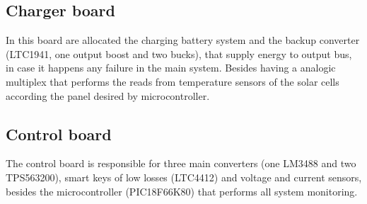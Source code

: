 \documentclass[3p]{elsarticle}
\begin{document}
\subsection{Charger board}
\label{Charger board}

	In this board are allocated the charging battery system and the backup converter (LTC1941, one output boost and two bucks), that supply energy to output bus, in case it happens any failure in the main system. Besides having a analogic multiplex that performs the reads from temperature sensors of the solar cells according the panel desired by microcontroller.\cite{1941}

\subsection{Control board}
\label{Control board}

	The control board is responsible for three main converters (one LM3488 and two TPS563200), smart keys of low losses (LTC4412) and voltage and current sensors, besides the microcontroller (PIC18F66K80)  that performs all system monitoring.\cite{3488}\cite{563200}\cite{4412}\cite{18f}
	
\end{document}

